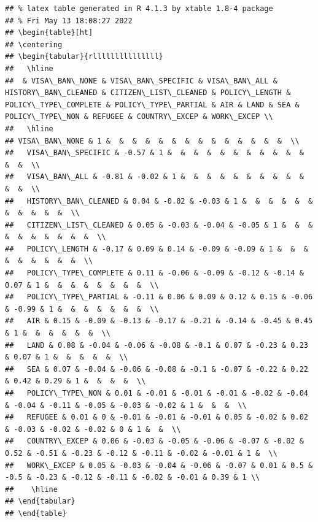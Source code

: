 \documentclass[]{article}
\begin{document}
\begin{verbatim}
## % latex table generated in R 4.1.3 by xtable 1.8-4 package
## % Fri May 13 18:08:27 2022
## \begin{table}[ht]
## \centering
## \begin{tabular}{rlllllllllllllll}
##   \hline
##  & VISA\_BAN\_NONE & VISA\_BAN\_SPECIFIC & VISA\_BAN\_ALL & HISTORY\_BAN\_CLEANED & CITIZEN\_LIST\_CLEANED & POLICY\_LENGTH & POLICY\_TYPE\_COMPLETE & POLICY\_TYPE\_PARTIAL & AIR & LAND & SEA & POLICY\_TYPE\_NON & REFUGEE & COUNTRY\_EXCEP & WORK\_EXCEP \\ 
##   \hline
## VISA\_BAN\_NONE & 1 &  &  &  &  &  &  &  &  &  &  &  &  &  &  \\ 
##   VISA\_BAN\_SPECIFIC & -0.57 & 1 &  &  &  &  &  &  &  &  &  &  &  &  &  \\ 
##   VISA\_BAN\_ALL & -0.81 & -0.02 & 1 &  &  &  &  &  &  &  &  &  &  &  &  \\ 
##   HISTORY\_BAN\_CLEANED & 0.04 & -0.02 & -0.03 & 1 &  &  &  &  &  &  &  &  &  &  &  \\ 
##   CITIZEN\_LIST\_CLEANED & 0.05 & -0.03 & -0.04 & -0.05 & 1 &  &  &  &  &  &  &  &  &  &  \\ 
##   POLICY\_LENGTH & -0.17 & 0.09 & 0.14 & -0.09 & -0.09 & 1 &  &  &  &  &  &  &  &  &  \\ 
##   POLICY\_TYPE\_COMPLETE & 0.11 & -0.06 & -0.09 & -0.12 & -0.14 & 0.07 & 1 &  &  &  &  &  &  &  &  \\ 
##   POLICY\_TYPE\_PARTIAL & -0.11 & 0.06 & 0.09 & 0.12 & 0.15 & -0.06 & -0.99 & 1 &  &  &  &  &  &  &  \\ 
##   AIR & 0.15 & -0.09 & -0.13 & -0.17 & -0.21 & -0.14 & -0.45 & 0.45 & 1 &  &  &  &  &  &  \\ 
##   LAND & 0.08 & -0.04 & -0.06 & -0.08 & -0.1 & 0.07 & -0.23 & 0.23 & 0.07 & 1 &  &  &  &  &  \\ 
##   SEA & 0.07 & -0.04 & -0.06 & -0.08 & -0.1 & -0.07 & -0.22 & 0.22 & 0.42 & 0.29 & 1 &  &  &  &  \\ 
##   POLICY\_TYPE\_NON & 0.01 & -0.01 & -0.01 & -0.01 & -0.02 & -0.04 & -0.04 & -0.11 & -0.05 & -0.03 & -0.02 & 1 &  &  &  \\ 
##   REFUGEE & 0.01 & 0 & -0.01 & -0.01 & -0.01 & 0.05 & -0.02 & 0.02 & -0.03 & -0.02 & -0.02 & 0 & 1 &  &  \\ 
##   COUNTRY\_EXCEP & 0.06 & -0.03 & -0.05 & -0.06 & -0.07 & -0.02 & 0.52 & -0.51 & -0.23 & -0.12 & -0.11 & -0.02 & -0.01 & 1 &  \\ 
##   WORK\_EXCEP & 0.05 & -0.03 & -0.04 & -0.06 & -0.07 & 0.01 & 0.5 & -0.5 & -0.23 & -0.12 & -0.11 & -0.02 & -0.01 & 0.39 & 1 \\ 
##    \hline
## \end{tabular}
## \end{table}
\end{verbatim}
\end{document}

